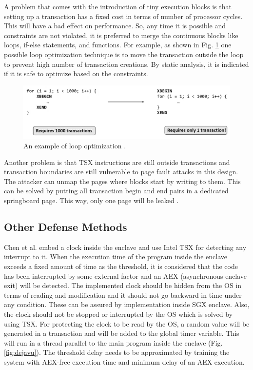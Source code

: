 A problem that comes with the introduction of tiny execution blocks is that setting up a transaction has a fixed cost in terms of number of processor cycles. This will have a bad effect on performance. So, any time it is possible and constraints are not violated, it is preferred to merge the continuous blocks like loops, if-else statements, and functions. For example, as shown in Fig. \ref{fig:tsgxloop} one possible loop optimization technique is to move the transaction outside the loop to prevent high number of transaction creations. By static analysis, it is indicated if it is safe to optimize based on the constraints.

\begin{figure}
	\includegraphics[scale=0.2]{images/tsgxloop}
	\caption{An example of loop optimization \cite{heisenberg}.}
	\label{fig:tsgxloop}
\end{figure}

Another problem is that TSX instructions are still outside transactions and transaction boundaries are still vulnerable to page fault attacks in this design. The attacker can unmap the pages where blocks start by writing to them. This can be solved by putting all transaction begin and end pairs in a dedicated springboard page. This way, only one page will be leaked \cite{tsgx}.

\subsection{Other Defense Methods}
Chen et al. \cite{dejavu} embed a clock inside the enclave and use Intel TSX for detecting any interrupt to it. When the execution time of the program inside the enclave exceeds a fixed amount of time as the threshold, it is considered that the code has been interrupted by some external factor and an AEX (asynchronous enclave exit) will be detected. The implemented clock should be hidden from the OS in terms of reading and modification and it should not go backward in time under any condition. These can be assured by implementation inside SGX enclave. Also, the clock should not be stopped or interrupted by the OS which is solved by using TSX. For protecting the clock to be read by the OS, a random value will be generated in a transaction and will be added to the global timer variable. This will run in a thread parallel to the main program inside the enclave (Fig. \ref{fig:dejavu}). The threshold delay needs to be approximated by training the system with AEX-free execution time and minimum delay of an AEX execution.

